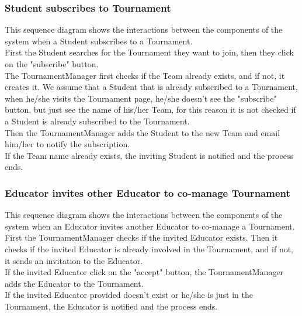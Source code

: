 \subsubsection{Student subscribes to Tournament}
This sequence diagram shows the interactions between the components of the system when a Student subscribes to a Tournament.\\
First the Student searches for the Tournament they want to join, then they click on the "subscribe" button.\\
The TournamentManager first checks if the Team already exists, and if not, it creates it. We assume that a Student that is already subscribed to a Tournament, when he/she visits the Tournament page, he/she doesn't see the "subscribe" 
button, but just see the name of his/her Team, for this reason it is not checked if a Student is already subscribed to the Tournament.\\
Then the TournamentManager adds the Student to the new Team and email him/her to notify the subscription.\\
If the Team name already exists, the inviting Student is notified and the process ends.\\

\clearpage
\subsubsection{Educator invites other Educator to co-manage Tournament}
This sequence diagram shows the interactions between the components of the system when an Educator invites another Educator to co-manage a Tournament.\\
First the TournamentManager checks if the invited Educator exists. Then it checks if the invited Educator is already involved in the Tournament, and if not, it sends an invitation to the Educator.\\
If the invited Educator click on the "accept" button, the TournamentManager adds the Educator to the Tournament.\\
If the invited Educator provided doesn't exist or he/she is just in the Tournament, the Educator is notified and the process ends.\\

\clearpage
